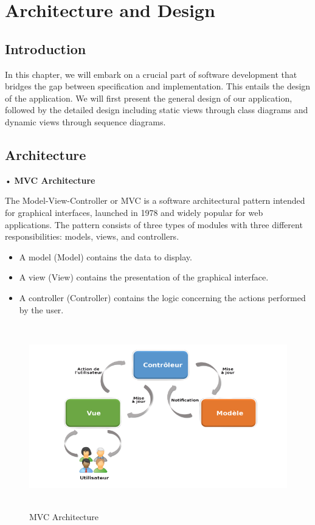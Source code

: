 \chapter{Architecture and Design }

\section{Introduction }
In this chapter, we will embark on a crucial part of software development that bridges the gap between specification and implementation. This entails the design of the application. We will first present the general design of our application, followed by the detailed design including static views through class diagrams and dynamic views through sequence diagrams. 

\section{Architecture  }

• \textbf{MVC Architecture} 

The Model-View-Controller or MVC is a software architectural pattern intended for graphical interfaces, launched in 1978 and widely popular for web applications. The pattern consists of three types of modules with three different responsibilities: models, views, and controllers.

\begin{itemize}
    \item A model (Model) contains the data to display.
    \item A view (View) contains the presentation of the graphical interface.
    \item A controller (Controller) contains the logic concerning the actions performed by the user.
\end{itemize}
 
\begin{figure}[H]
   \centering
    \includegraphics[width=15cm,height=8cm]{images/MVC.png}
    \caption{MVC Architecture} 
    \label{MVC Architecture}
\end{figure}

